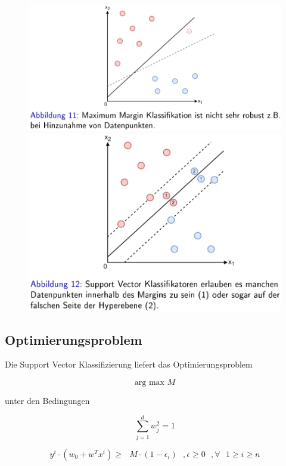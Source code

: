 \documentclass{report}
\begin{document}
\begin{figure}[H]
  \centering
  \begin{minipage}[b]{0.4\textwidth}
    \includegraphics[scale=.265]{ml06_11}
  \end{minipage}
  \hfill
  \begin{minipage}[b]{0.4\textwidth}
    \includegraphics[scale=.275]{ml06_12}
  \end{minipage}
\end{figure}

\subsection{Optimierungsproblem}

Die Support Vector Klassifizierung liefert das Optimierungsproblem

$$\text{arg max } M$$

unter den Bedingungen

$$\sum_{j=1}^dw_j^2 = 1$$

$$y^i\cdot(w_0 + w^Tx^i)\geq \text{ }M\cdot(1 - \epsilon_i)\text{ },\epsilon\geq 0\text{ }, \forall\text{ }1\geq i\geq n$$
\end{document}
